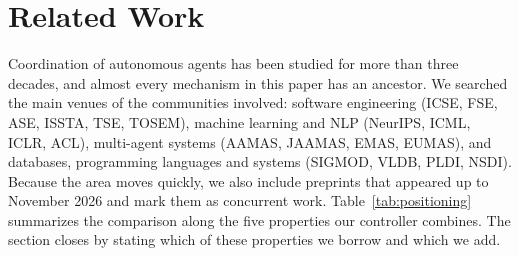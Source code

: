 \section{Related Work}\label{sec:related}
Coordination of autonomous agents has been studied for more than three decades, and almost every mechanism in this paper has an ancestor. We searched the main venues of the communities involved: software engineering (ICSE, FSE, ASE, ISSTA, TSE, TOSEM), machine learning and NLP (NeurIPS, ICML, ICLR, ACL), multi-agent systems (AAMAS, JAAMAS, EMAS, EUMAS), and databases, programming languages and systems (SIGMOD, VLDB, PLDI, NSDI). Because the area moves quickly, we also include preprints that appeared up to November 2026 and mark them as concurrent work. Table~\ref{tab:positioning} summarizes the comparison along the five properties our controller combines. The section closes by stating which of these properties we borrow and which we add.

